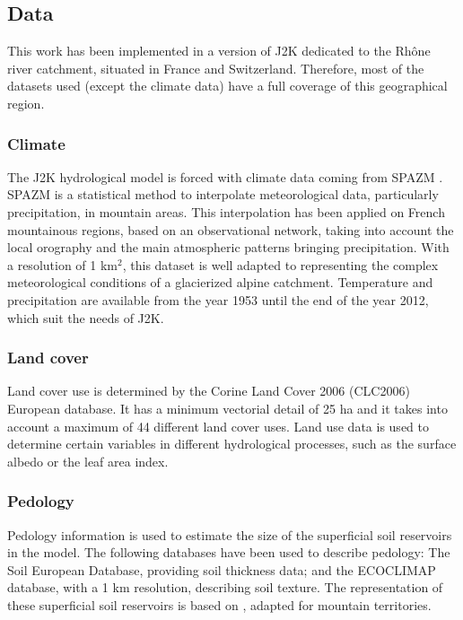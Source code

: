 \subsection{Data}

This work has been implemented in a version of J2K dedicated to the Rhône river catchment, situated in France and Switzerland. Therefore, most of the datasets used (except the climate data) have a full coverage of this geographical region.

\subsubsection{Climate}

The J2K hydrological model is forced with climate data coming from SPAZM \citep{gottardi_statistical_2012}. SPAZM is a statistical method to interpolate meteorological data, particularly precipitation, in mountain areas. This interpolation has been applied on French mountainous regions, based on an observational network, taking into account the local orography and the main atmospheric patterns bringing precipitation. With a resolution of 1 km$^{2}$, this dataset is well adapted to representing the complex meteorological conditions of a glacierized alpine catchment. Temperature and precipitation are available from the year 1953 until the end of the year 2012, which suit the needs of J2K.

\subsubsection{Land cover}

Land cover use is determined by the Corine Land Cover 2006 (CLC2006) European database. It has a minimum vectorial detail of 25 ha and it takes into account a maximum of 44 different land cover uses. Land use data is used to determine certain variables in different hydrological processes, such as the surface albedo or the leaf area index. 

\subsubsection{Pedology}

Pedology information is used to estimate the size of the superficial soil reservoirs in the model. The following databases have been used to describe pedology: The Soil European Database, providing soil thickness data; and the ECOCLIMAP database, with a 1 km resolution, describing soil texture. The representation of these superficial soil reservoirs is based on \citet{sauquet_risk_2014}, adapted for mountain territories. 

